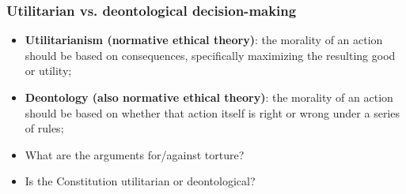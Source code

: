 \documentclass[aspectratio=169]{beamer}
\theoremstyle{principle}
\begin{document}
\begin{frame}
\frametitle{Utilitarian vs. deontological decision-making}
\begin{itemize}
\item \textbf{Utilitarianism (normative ethical theory)}: the morality of an action should be based on consequences, specifically maximizing the resulting good or utility;
\bigskip
\bigskip
\item \textbf{Deontology (also normative ethical theory)}: the morality of an action should be based on whether that action itself is right or wrong under a series of rules;
\bigskip
\bigskip
\item What are the arguments for/against torture?
\bigskip
\bigskip
\item Is the Constitution utilitarian or deontological?
\end{itemize}
\end{frame}
\end{document}
